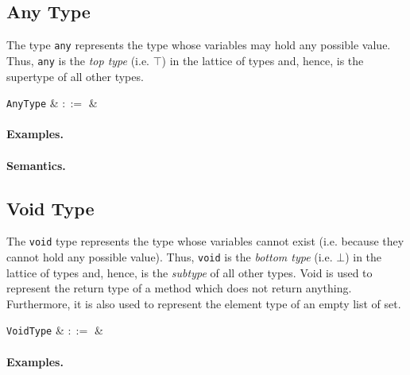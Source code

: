 
\subsection{Any Type}

The type \lstinline{any} represents the type whose variables may hold any possible value.  Thus, \lstinline{any} is the {\em top type} (i.e. $\top$) in the lattice of types and, hence, is the supertype of all other types.

\begin{syntax}
  \verb+AnyType+ & $::=$ &  \\
\end{syntax}


\paragraph{Examples.}

\paragraph{Semantics.}


\subsection{Void Type}

The \lstinline{void} type represents the type whose variables cannot exist (i.e. because they cannot hold any possible value).  Thus, \lstinline{void} is the {\em bottom type} (i.e. $\bot$) in the lattice of types and, hence, is the {\em subtype} of all other types.  Void is used to represent the return type of a method which does not return anything.  Furthermore, it is also used to represent the element type of an empty list of set. 

\begin{syntax}
   \verb+VoidType+ & $::=$ &  \\
\end{syntax}

\paragraph{Examples.}

